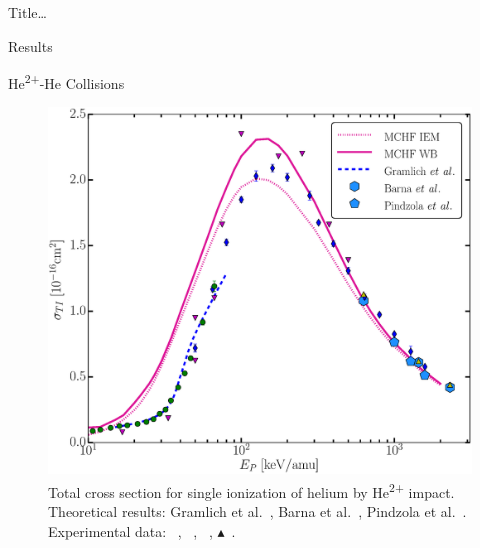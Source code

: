 \documentclass[letterpaper, 10 pt]{report}
\begin{document}
\begin{chapter}{ Title\dots \label{chap:p-he2p-he}}
\begin{section}{Results \label{sec:phe2p-res}}
\begin{subsection}{\texorpdfstring{He\textsuperscript{2+}}{He2+}-He Collisions 
                         \label{sec:he2phe-res}}
\begin{figure}[ht]
\begin{minipage}{.49\linewidth}
               \centering
               \includegraphics[width = \linewidth]{./images/he2phe/he2phe-TI.eps}
               \caption[Total cross section for single ionization of helium by He\textsuperscript{2+}
                        impact.]{Total cross section for single ionization of helium by
                        He\textsuperscript{2+} impact. Theoretical results: Gramlich
                        et al.~\cite{GGS-89}, Barna
                        et al.~\cite{BTB-05}, Pindzola et al.~\cite{PRC-07}.
                        Experimental data: {\color{blue}{$\blacklozenge$}}~\cite{SG85},
                        {\color{OliveGreen}{$\bullet$}}~\cite{SG89},
                        {\color{RedViolet}{$\blacktriangledown$}}~\cite{Dubois87},
                        {\color{GreenYellow}$\blacktriangle$}~\cite{KAH84}. \label{fig:he2phe-ti}}
            \end{minipage} \hspace{0.04\linewidth} %
            \begin{minipage}{.49\linewidth}


\end{minipage}
\end{figure}
\end{subsection}
\end{section}
\end{chapter}
\end{document}
